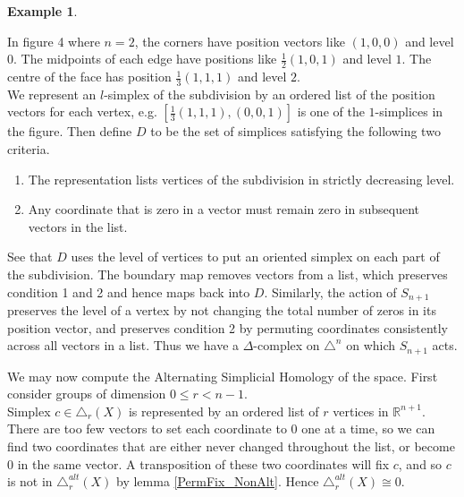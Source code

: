 \documentclass[11pt,a4paper,twoside]{article}
\theoremstyle{plain}
\theoremstyle{definition}
\theoremstyle{definition}
\theoremstyle{definition}
\theoremstyle{definition}
\newtheorem{example}[thm]{Example}
\theoremstyle{definition}
\begin{document}
\begin{example}
\begin{figure}
\end{figure}
In figure 4 where $n=2$, the corners have position vectors like $(1,0,0)$ and level $0$. The midpoints of each edge have positions like $\frac12(1,0,1)$ and level $1$. The centre of the face has position $\frac13(1,1,1)$ and level $2$.\\
We represent an $l$-simplex of the subdivision by an ordered list of the position vectors for each vertex, e.g. $[\frac1{3}(1,1,1),(0,0,1)]$ is one of the $1$-simplices in the figure. Then define $D$ to be the set of simplices satisfying the following two criteria.
\begin{enumerate}
    \item The representation lists vertices of the subdivision in strictly decreasing level.
    \item Any coordinate that is zero in a vector must remain zero in subsequent vectors in the list.
\end{enumerate}
See that $D$ uses the level of vertices to put an oriented simplex on each part of the subdivision. The boundary map removes vectors from a list, which preserves condition 1 and 2 and hence maps back into $D$. Similarly, the action of $S_{n+1}$ preserves the level of a vertex by not changing  the total number of zeros in its position vector, and preserves condition 2 by permuting coordinates consistently across all vectors in a list. Thus we have a $\Delta$-complex on $\triangle^n$ on which $S_{n+1}$ acts.

We may now compute the Alternating Simplicial Homology of the space. First consider groups of dimension $0\leq r < n\!-\!1$.\\
Simplex $c\in \triangle_r(X)$ is represented by an ordered list of $r$ vertices in $\mathbb{R}^{n+1}$. There are too few vectors to set each coordinate to $0$ one at a time, so we can find two coordinates that are either never changed throughout the list, or become $0$ in the same vector. A transposition of these two coordinates will fix $c$, and so $c$ is not in $\triangle_r^{alt}(X)$ by lemma \ref{PermFix_NonAlt}. Hence $\triangle_r^{alt}(X)\cong0$.


\end{example}
\end{document}
